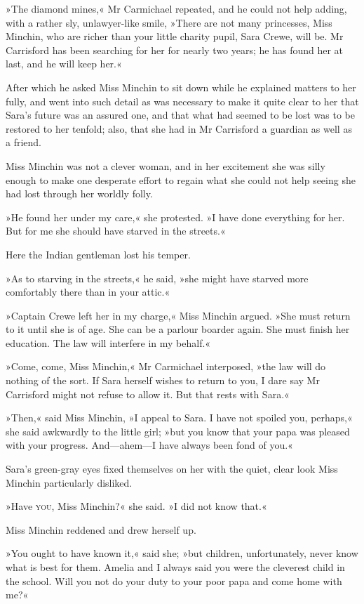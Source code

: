 »The diamond mines,« Mr Carmichael repeated, and he could not help adding, with a rather sly, unlawyer-like smile, »There are not many princesses, Miss Minchin, who are richer than your little charity pupil, Sara Crewe, will be. Mr Carrisford has been searching for her for nearly two years; he has found her at last, and he will keep her.«

After which he asked Miss Minchin to sit down while he explained matters to her fully, and went into such detail as was necessary to make it quite clear to her that Sara's future was an assured one, and that what had seemed to be lost was to be restored to her tenfold; also, that she had in Mr Carrisford a guardian as well as a friend.

Miss Minchin was not a clever woman, and in her excitement she was silly enough to make one desperate effort to regain what she could not help seeing she had lost through her worldly folly.

»He found her under my care,« she protested. »I have done everything for her. But for me she should have starved in the streets.«

Here the Indian gentleman lost his temper.

»As to starving in the streets,« he said, »she might have starved more comfortably there than in your attic.«

»Captain Crewe left her in my charge,« Miss Minchin argued. »She must return to it until she is of age. She can be a parlour boarder again. She must finish her education. The law will interfere in my behalf.«

»Come, come, Miss Minchin,« Mr Carmichael interposed, »the law will do nothing of the sort. If Sara herself wishes to return to you, I dare say Mr Carrisford might not refuse to allow it. But that rests with Sara.«

»Then,« said Miss Minchin, »I appeal to Sara. I have not spoiled you, perhaps,« she said awkwardly to the little girl; »but you know that your papa was pleased with your progress. And—ahem—I have always been fond of you.«

Sara's green-gray eyes fixed themselves on her with the quiet, clear look Miss Minchin particularly disliked.

»Have \textsc{you}, Miss Minchin?« she said. »I did not know that.«

Miss Minchin reddened and drew herself up.

»You ought to have known it,« said she; »but children, unfortunately, never know what is best for them. Amelia and I always said you were the cleverest child in the school. Will you not do your duty to your poor papa and come home with me?«

